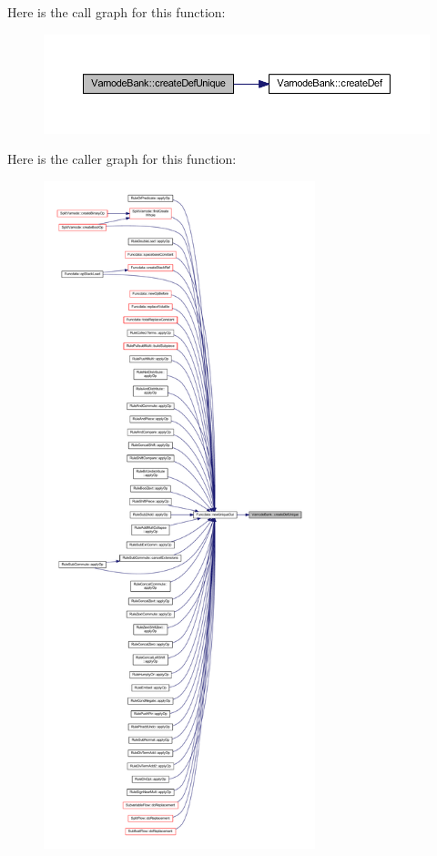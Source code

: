 Here is the call graph for this function\+:
\nopagebreak
\begin{figure}[H]
\begin{center}
\leavevmode
\includegraphics[width=350pt]{class_varnode_bank_a9b47054374533bec02c4b467b390b6ca_cgraph}
\end{center}
\end{figure}
Here is the caller graph for this function\+:
\nopagebreak
\begin{figure}[H]
\begin{center}
\leavevmode
\includegraphics[height=550pt]{class_varnode_bank_a9b47054374533bec02c4b467b390b6ca_icgraph}
\end{center}
\end{figure}
\mbox{\label{class_varnode_bank_ab73cb940a84d7cb07870f4cb50c66fb1}} 
